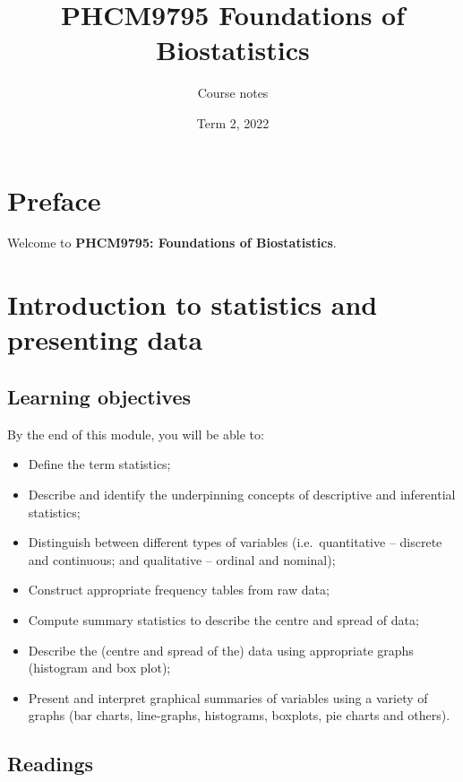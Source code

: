 \documentclass[
]{memoir}
\title{PHCM9795 Foundations of Biostatistics}
\author{Course notes}
\date{Term 2, 2022}
\providecommand{\tightlist}{%
  \setlength{\itemsep}{0pt}\setlength{\parskip}{0pt}}
\begin{document}
\maketitle

{
\setcounter{tocdepth}{1}
\tableofcontents
}
\hypertarget{preface}{%
\chapter*{Preface}\label{preface}}

Welcome to \textbf{PHCM9795: Foundations of Biostatistics}.

\hypertarget{introduction-to-statistics-and-presenting-data}{%
\chapter{Introduction to statistics and presenting data}\label{introduction-to-statistics-and-presenting-data}}

\hypertarget{learning-objectives}{%
\section*{Learning objectives}\label{learning-objectives}}

By the end of this module, you will be able to:

\begin{itemize}
\tightlist
\item
  Define the term statistics;
\item
  Describe and identify the underpinning concepts of descriptive and inferential statistics;
\item
  Distinguish between different types of variables (i.e.~quantitative -- discrete and continuous; and qualitative -- ordinal and nominal);
\item
  Construct appropriate frequency tables from raw data;
\item
  Compute summary statistics to describe the centre and spread of data;
\item
  Describe the (centre and spread of the) data using appropriate graphs (histogram and box plot);
\item
  Present and interpret graphical summaries of variables using a variety of graphs (bar charts, line-graphs, histograms, boxplots, pie charts and others).
\end{itemize}

\hypertarget{readings}{%
\section*{Readings}\label{readings}}
\end{document}

